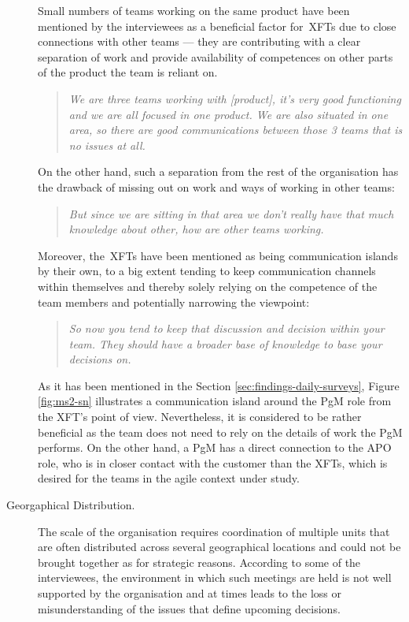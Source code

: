 \begin{description}
Small numbers of teams working on the same product have been mentioned by the interviewees as a beneficial factor for~\acp{XFT} due to close connections with other teams — they are contributing with a clear separation of work and provide availability of competences on other parts of the product the team is reliant on.

      \begin{quote}\itshape We are three teams working with [product], it's very good functioning and we are all focused in one product. We are also situated in one area, so there are good communications between those 3 teams that is no issues at all.
      \end{quote}

   On the other hand, such a separation from the rest of the organisation has the drawback of missing out on work and ways of working in other teams:

      \begin{quote}\itshape But since we are sitting in that area we don't really have that much knowledge about other, how are other teams working.
      \end{quote}

   Moreover, the~\acp{XFT} have been mentioned as being communication islands by their own, to a big extent tending to keep communication channels within themselves and thereby solely relying on the competence of the team members and potentially narrowing the viewpoint:

      \begin{quote}\itshape So now you tend to keep that discussion and decision within your team. They should have a broader base of knowledge to base your decisions on.
      \end{quote}
      
As it has been mentioned in the Section \ref{sec:findings-daily-surveys}, Figure \ref{fig:ms2-sn} illustrates a communication island around the \ac{PgM} role from the \ac{XFT}'s point of view. Nevertheless, it is considered to be rather beneficial as the team does not need to rely on the details of work the \ac{PgM} performs. On the other hand, a \ac{PgM} has a direct connection to the \ac{APO} role, who is in closer contact with the customer than the \acp{XFT}, which is desired for the teams in the agile context under study.

   \item[Georgaphical Distribution.] The scale of the organisation requires coordination of multiple units that are often distributed across several geographical locations and could not be brought together as for strategic reasons. According to some of the interviewees, the environment in which such meetings are held is not well supported by the organisation and at times leads to the loss or misunderstanding of the issues that define upcoming decisions.
   

\end{description}
